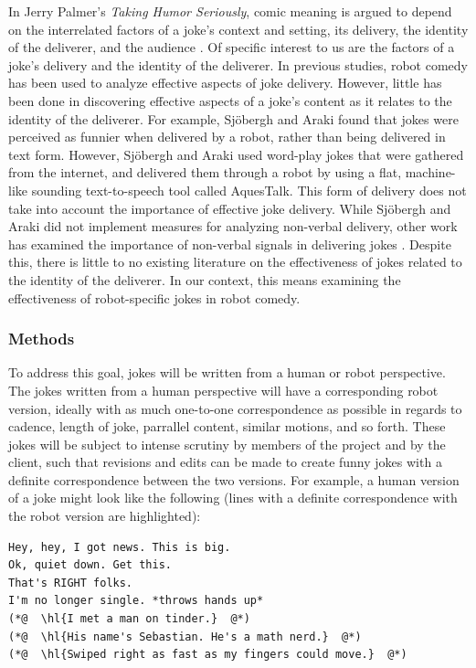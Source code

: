 \documentclass[onecolumn, draftclsnofoot,10pt, compsoc]{IEEEtran}
\begin{document}
In Jerry Palmer's \textit{Taking Humor Seriously}, comic meaning is argued to depend on the interrelated factors of a joke's context and setting, its delivery, the identity of the deliverer, and the audience \cite{Palmer:1993}.
Of specific interest to us are the factors of a joke's delivery and the identity of the deliverer.
In previous studies, robot comedy has been used to analyze effective aspects of joke delivery.
However, little has been done in discovering effective aspects of a joke's content as it relates to the identity of the deliverer.
For example, Sj\"{o}bergh and Araki \cite{RobotsMakeThings:2008} found that jokes were perceived as funnier when delivered by a robot, rather than being delivered in text form.
However, Sj\"{o}bergh and Araki used word-play jokes that were gathered from the internet, and delivered them through a robot by using a flat, machine-like sounding text-to-speech tool called AquesTalk. This form of delivery does not take into account the importance of effective joke delivery. While Sj\"{o}bergh and Araki did not implement measures for analyzing non-verbal delivery, other work has examined the importance of non-verbal signals in delivering jokes \cite{KatevasRobot:2014} \cite{KnightEightLessons:2011}.
Despite this, there is little to no existing literature on the effectiveness of jokes related to the identity of the deliverer.
In our context, this means examining the effectiveness of robot-specific jokes in robot comedy.

\subsubsection{Methods}
To address this goal, jokes will be written from a human or robot perspective. The jokes written from a human
perspective will have a corresponding robot version, ideally with as much one-to-one correspondence as possible in
regards to cadence, length of joke, parrallel content, similar motions, and so forth. These jokes will be subject to intense
scrutiny by members of the project and by the client, such that revisions and edits can be made to create funny jokes
with a definite correspondence between the two versions. For example, a human version of a joke might look like the
following (lines with a definite correspondence with the robot version are highlighted):

\begin{lstlisting}
Hey, hey, I got news. This is big.
Ok, quiet down. Get this.
That's RIGHT folks.
I'm no longer single. *throws hands up*
(*@  \hl{I met a man on tinder.}  @*)
(*@  \hl{His name's Sebastian. He's a math nerd.}  @*)
(*@  \hl{Swiped right as fast as my fingers could move.}  @*)
\end{lstlisting}
\end{document}
